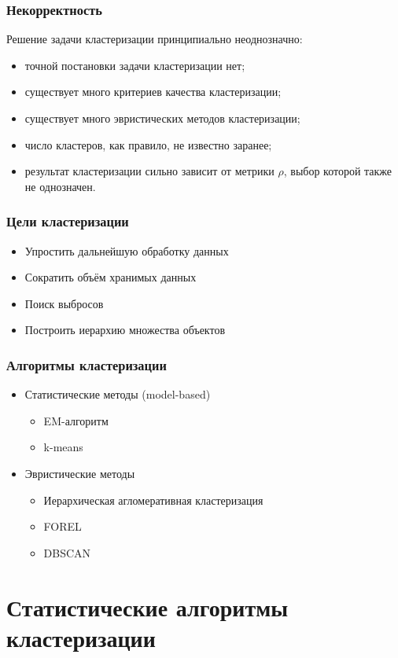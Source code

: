 \documentclass[12pt,pdf,notheorems]{beamer}
\begin{document}
\begin{frame}\frametitle{Некорректность}
Решение задачи кластеризации принципиально неоднозначно:
	\begin{itemize}
		\item точной постановки задачи кластеризации нет;
		\item существует много критериев качества кластеризации;
		\item существует много эвристических методов кластеризации;
		\item число кластеров, как правило, не известно заранее;
		\item результат кластеризации сильно зависит от метрики $\rho$, выбор которой также не однозначен.
	\end{itemize}
\end{frame}

\begin{frame}\frametitle{Цели кластеризации}
	\begin{itemize}
		\item Упростить дальнейшую обработку данных
		\item Сократить объём хранимых данных
		\item Поиск выбросов
		\item Построить иерархию множества объектов
	\end{itemize}
\end{frame}

\begin{frame}\frametitle{Алгоритмы кластеризации}
	\begin{itemize}
		\item Статистические методы (model-based)
			\begin{itemize}
				\item EM-алгоритм
				\item k-means
			\end{itemize}
		\item Эвристические методы
			\begin{itemize}
				\item Иерархическая агломеративная кластеризация
				\item FOREL
				\item DBSCAN
			\end{itemize}
	\end{itemize}
\end{frame}

\section[Статистические алгоритмы кластеризации]{Статистические алгоритмы кластеризации}
\end{document}

